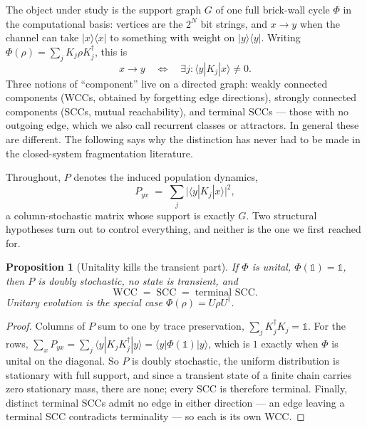 \documentclass[11pt]{article}
\theoremstyle{plain}
\newtheorem{proposition}{Proposition}
\theoremstyle{definition}
\theoremstyle{remark}
\begin{document}
The object under study is the support graph $G$ of one full brick-wall cycle
$\Phi$ in the computational basis: vertices are the $2^N$ bit strings, and
$x \to y$ when the channel can take $|x\rangle\langle x|$ to something with
weight on $|y\rangle\langle y|$. Writing $\Phi(\rho) = \sum_j K_j \rho
K_j^\dagger$, this is
\begin{equation}
  x \to y \quad\Longleftrightarrow\quad
  \exists j : \langle y | K_j | x \rangle \neq 0 .
  \label{eq:graph}
\end{equation}
Three notions of ``component'' live on a directed graph: weakly connected
components (WCCs, obtained by forgetting edge directions), strongly connected
components (SCCs, mutual reachability), and terminal SCCs --- those with no
outgoing edge, which we also call recurrent classes or attractors. In general
these are different. The following says why the distinction has never had to be
made in the closed-system fragmentation literature.

Throughout, $P$ denotes the induced population dynamics,
\begin{equation}
  P_{yx} \;=\; \sum_j \big| \langle y | K_j | x \rangle \big|^2 ,
  \label{eq:P}
\end{equation}
a column-stochastic matrix whose support is exactly $G$. Two structural
hypotheses turn out to control everything, and neither is the one we first
reached for.

\begin{proposition}[Unitality kills the transient part]
\label{prop:doubly}
If $\Phi$ is \emph{unital}, $\Phi(\mathbb{1}) = \mathbb{1}$, then $P$ is doubly
stochastic, no state is transient, and
\[
  \text{WCC} \;=\; \text{SCC} \;=\; \text{terminal SCC}.
\]
Unitary evolution is the special case $\Phi(\rho) = U\rho U^\dagger$.
\end{proposition}

\begin{proof}
Columns of $P$ sum to one by trace preservation, $\sum_j K_j^\dagger K_j =
\mathbb{1}$. For the rows,
$\sum_x P_{yx} = \sum_j \langle y | K_j K_j^\dagger | y \rangle
= \langle y | \Phi(\mathbb{1}) | y \rangle$, which is $1$ exactly when $\Phi$ is
unital on the diagonal. So $P$ is doubly stochastic, the uniform distribution
is stationary with full support, and since a transient state of a finite chain
carries zero stationary mass, there are none; every SCC is therefore terminal.
Finally, distinct terminal SCCs admit no edge in either direction --- an edge
leaving a terminal SCC contradicts terminality --- so each is its own WCC.
\end{proof}
\end{document}
